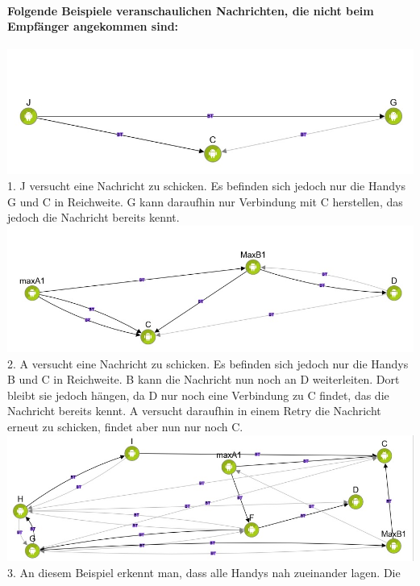 \paragraph{Folgende Beispiele veranschaulichen Nachrichten, die nicht beim Empfänger angekommen sind:}
\includegraphics[width=1.0\textwidth]{belege/grosstests/Bilder/Miserfolg6.jpg}\\ 1. J versucht
eine Nachricht zu schicken. Es befinden sich jedoch nur die Handys G und
C in Reichweite. G kann daraufhin nur Verbindung mit C herstellen, das
jedoch die Nachricht bereits kennt.\\
\includegraphics[width=1.0\textwidth]{belege/grosstests/Bilder/Miserfolg5.jpg}\\ 2. A versucht
eine Nachricht zu schicken. Es befinden sich jedoch nur die Handys B und
C in Reichweite. B kann die Nachricht nun noch an D weiterleiten. Dort
bleibt sie jedoch hängen, da D nur noch eine Verbindung zu C findet, das
die Nachricht bereits kennt. A versucht daraufhin in einem Retry die
Nachricht erneut zu schicken, findet aber nun nur noch C.\\
\includegraphics[width=1.0\textwidth]{belege/grosstests/Bilder/Miserfolg4.jpg}\\ 3. An diesem
Beispiel erkennt man, dass alle Handys nah zueinander lagen. Die
